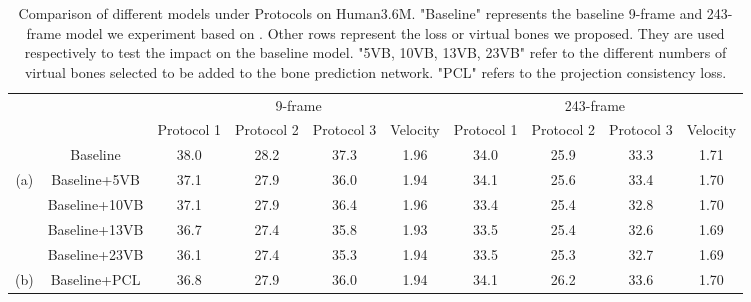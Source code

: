 \documentclass[journal]{IEEEtran}
\begin{document}
\begin{table*}[t]
	\begin{center}
		\resizebox{0.9\textwidth}{!}
		{
			\begin{tabular}{|c|c|c|c|c|c|c|c|c|c|}
				\hline
				&                   & \multicolumn{4}{c|}{9-frame}                                               & \multicolumn{4}{c|}{243-frame}                                            \\ \cline{3-10} 
				&                   & Protocol 1 & Protocol 2 & Protocol 3 & Velocity & Protocol 1 & Protocol 2 & Protocol 3 & Velocity \\ \hline
				& Baseline & 38.0                & 28.2                & 37.3                & 1.96              & 34.0                & 25.9                & 33.3                & 1.71              \\ \hline
				
				\multirow{4}{*}{(a)} & Baseline+5VB      & 37.1                & 27.9                & 36.0                & 1.94              & 34.1                & 25.6                & 33.4               & 1.70              \\
				& Baseline+10VB     & 37.1                & 27.9                & 36.4                & 1.96              & 33.4                & 25.4                & 32.8                & 1.70              \\
				& Baseline+13VB    & 36.7                & 27.4                & 35.8                & 1.93              & 33.5                & 25.4                & 32.6                & 1.69              \\
				& Baseline+23VB     & 36.1                & 27.4                & 35.3                & 1.94              & 33.5                & 25.3                & 32.7                & 1.69              \\ \hline
				(b) & 
				Baseline+PCL  & 36.8                & 27.9                & 36.0                & 1.94              & 34.1                & 26.2                & 33.6                & 1.70              \\ \hline
			\end{tabular}
		}
	\end{center}
	\vspace{-0pt}
	\caption{Comparison of different models under Protocols on Human3.6M. "Baseline" represents the baseline 9-frame and 243-frame model we experiment based on  \cite{2020Anatomy}. Other rows represent the loss or virtual bones we proposed. They are used respectively to test the impact on the baseline model. "5VB, 10VB, 13VB, 23VB" refer to the different numbers of virtual bones selected to be added to the bone prediction network. "PCL" refers to the projection consistency loss.}
	\label{table:ablation}
	\vspace{-0pt}
\end{table*}
\end{document}
